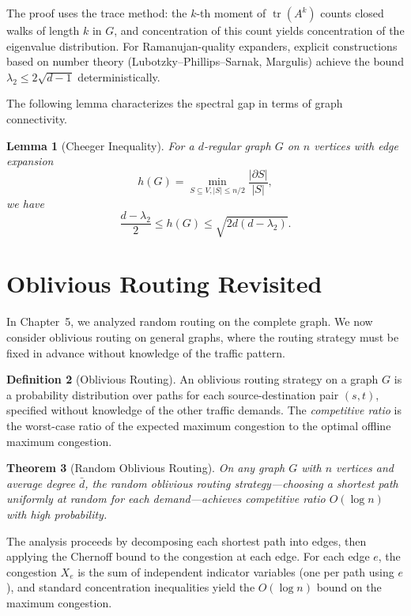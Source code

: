 \documentclass[twoside,12pt]{book}
\theoremstyle{plain}
\newtheorem{theorem}{Theorem}[chapter]
\newtheorem{lemma}[theorem]{Lemma}
\theoremstyle{definition}
\newtheorem{definition}[theorem]{Definition}
\theoremstyle{remark}
\begin{document}
The proof uses the trace method: the $k$-th moment of
$\operatorname{tr}(A^k)$ counts closed walks of length $k$ in $G$, and
concentration of this count yields concentration of the eigenvalue
distribution. For Ramanujan-quality expanders, explicit constructions
based on number theory (Lubotzky--Phillips--Sarnak, Margulis) achieve the
bound $\lambda_2 \leq 2\sqrt{d-1}$ deterministically.

The following lemma characterizes the spectral gap in terms of graph
connectivity.

\begin{lemma}[Cheeger Inequality]
\label{lem:cheeger}
For a $d$-regular graph $G$ on $n$ vertices with edge expansion
\[
h(G) = \min_{S \subseteq V, |S| \leq n/2} \frac{|\partial S|}{|S|},
\]
we have
\[
\frac{d - \lambda_2}{2} \leq h(G) \leq \sqrt{2d(d - \lambda_2)}.
\]
\end{lemma}

\section{Oblivious Routing Revisited}
\label{sec:oblivious-routing}

In Chapter~5, we analyzed random routing on the complete graph. We now
consider oblivious routing on general graphs, where the routing strategy
must be fixed in advance without knowledge of the traffic pattern.

\begin{definition}[Oblivious Routing]
An oblivious routing strategy on a graph $G$ is a probability distribution
over paths for each source-destination pair $(s, t)$, specified without
knowledge of the other traffic demands. The \emph{competitive ratio} is
the worst-case ratio of the expected maximum congestion to the optimal
offline maximum congestion.
\end{definition}

\begin{theorem}[Random Oblivious Routing]
\label{thm:oblivious-routing}
On any graph $G$ with $n$ vertices and average degree $\bar{d}$, the
random oblivious routing strategy---choosing a shortest path uniformly at
random for each demand---achieves competitive ratio $O(\log n)$ with high
probability.
\end{theorem}

The analysis proceeds by decomposing each shortest path into edges, then
applying the Chernoff bound to the congestion at each edge. For each edge
$e$, the congestion $X_e$ is the sum of independent indicator variables
(one per path using $e$), and standard concentration inequalities yield
the $O(\log n)$ bound on the maximum congestion.
\end{document}
